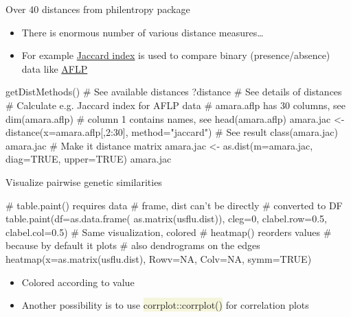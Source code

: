 \documentclass[compress, xelatex, 11pt, xcolor=svgnames, aspectratio=169,
	hyperref={
		bookmarks=true,
		unicode=true,
		colorlinks=true,
		pdftitle={Molecular data in R},
		plainpages=false,
		pdfauthor={Vojtech Zeisek},
		pdfsubject={Course about phylogeny and evolution in R},
		pdfcreator={XeLaTeX},
		pdfkeywords={R, evolution, phylogeny, molecular data},
		linkcolor=Crimson, %
		anchorcolor=Magenta, %
		citecolor=Magenta, %
		filecolor=Magenta, %
		menucolor=Magenta, %
		urlcolor=DodgerBlue, %
		},
	url={hyphens, lowtilde} %
	]{beamer}
\renewcommand{\texttt}[1]{\colorbox{Beige}{{\ttfamily #1}}}
\begin{document}
\begin{frame}[fragile]{Over 40 distances from philentropy package}
	\begin{itemize}
		\item There is enormous number of various distance measures\ldots
		\item For example \href{https://en.wikipedia.org/wiki/Jaccard_index}{Jaccard index} is used to compare binary (presence/absence) data like \href{https://en.wikipedia.org/wiki/Amplified_fragment_length_polymorphism}{AFLP}
	\end{itemize}
	\begin{spluscode}
    getDistMethods() # See available distances
    ?distance # See details of distances
    # Calculate e.g. Jaccard index for AFLP data
    # amara.aflp has 30 columns, see dim(amara.aflp)
    # column 1 contains names, see head(amara.aflp)
    amara.jac <- distance(x=amara.aflp[,2:30], method="jaccard")
    # See result
    class(amara.jac)
    amara.jac
    # Make it distance matrix
    amara.jac <- as.dist(m=amara.jac, diag=TRUE, upper=TRUE)
    amara.jac
	\end{spluscode}
\end{frame}

\begin{frame}[fragile]{Visualize pairwise genetic similarities}
	\begin{multicols}{2}
		\vfil
		\begin{spluscode}
    # table.paint() requires data
    # frame, dist can't be directly
    # converted to DF
    table.paint(df=as.data.frame(
      as.matrix(usflu.dist)), cleg=0,
      clabel.row=0.5, clabel.col=0.5)
    # Same visualization, colored
    # heatmap() reorders values
    # because by default it plots
    # also dendrograms on the edges
    heatmap(x=as.matrix(usflu.dist),
      Rowv=NA, Colv=NA, symm=TRUE)
		\end{spluscode}
		\vfill
		\begin{itemize}
			\item Colored according to value
			\item Another possibility is to use \texttt{corrplot::corrplot()} for correlation plots
		\end{itemize}
		\columnbreak
		\begin{center}
			\texttt{[image: dna-dists.png]}
		\end{center}
	\end{multicols}
\end{frame}
\end{document}
